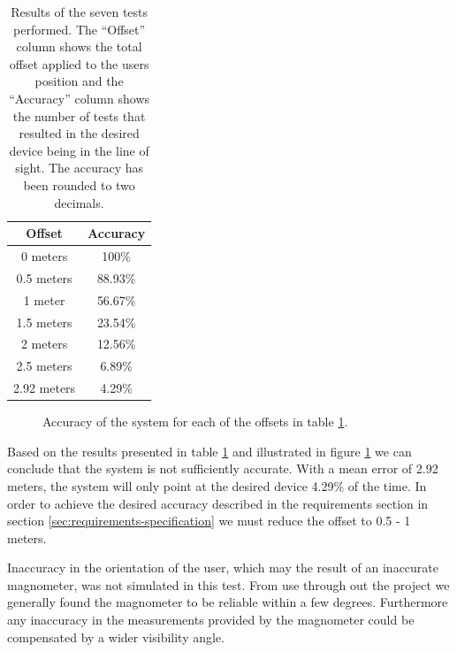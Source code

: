 \begin{table}[]
\centering
\caption{Results of the seven tests performed. The ``Offset'' column shows the total offset applied to the users position and the ``Accuracy'' column shows the number of tests that resulted in the desired device being in the line of sight. The accuracy has been rounded to two decimals.}
\label{lst:evaluation:system-correctness:results}
\begin{tabular}{cc}
\textbf{Offset} & \textbf{Accuracy} \\
\hline
0 meters        & 100\%           \\
0.5 meters      & 88.93\%         \\
1 meter         & 56.67\%         \\
1.5 meters      & 23.54\%         \\
2 meters        & 12.56\%         \\
2.5 meters      & 6.89\%         \\
2.92 meters     & 4.29\%        
\end{tabular}
\end{table}

\begin{figure}[!htb]
    \centering
    
    \caption{Accuracy of the system for each of the offsets in table \ref{lst:evaluation:system-correctness:results}.}
    \label{fig:evaluation:system-correctness:results}
\end{figure}

Based on the results presented in table \ref{lst:evaluation:system-correctness:results} and illustrated in figure \ref{fig:evaluation:system-correctness:results} we can conclude that the system is not sufficiently accurate. With a mean error of 2.92 meters, the system will only point at the desired device 4.29\% of the time. In order to achieve the desired accuracy described in the requirements section in section \ref{sec:requirements-specification} we must reduce the offset to 0.5 - 1 meters.

Inaccuracy in the orientation of the user, which may the result of an inaccurate magnometer, was not simulated in this test. From use through out the project we generally found the magnometer to be reliable within a few degrees. Furthermore any inaccuracy in the measurements provided by the magnometer could be compensated by a wider visibility angle.

